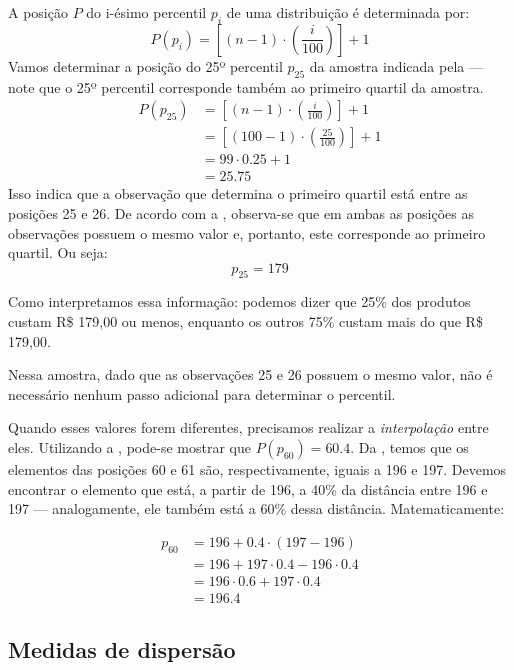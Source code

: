 A posição $P$ do i-ésimo percentil $p_i$ de uma distribuição é determinada por:
\begin{equation}
    P(p_i)=\left[(n-1) \cdot \left(\frac{i}{100}\right)\right] + 1
    \label{eq:pos-percentil}
\end{equation}
Vamos determinar a posição do 25º percentil $p_{25}$ da amostra indicada pela
 --- note que o 25º percentil corresponde
também ao primeiro quartil da amostra.
\begin{align*}
    P(p_{25})&=\left[(n-1) \cdot \left(\frac{i}{100}\right)\right] + 1 \\
             &=\left[(100-1) \cdot \left(\frac{25}{100}\right)\right] + 1 \\
             &=99 \cdot 0.25 + 1 \\
             &=25.75
\end{align*}
Isso indica que a observação que determina o primeiro quartil está entre as
posições 25 e 26. De acordo com a ,
observa-se que em ambas as posições as observações possuem o mesmo valor
e, portanto, este corresponde ao primeiro quartil. Ou seja:
\[
    p_{25}=179
\]

Como interpretamos essa informação: podemos dizer que 25\% dos produtos custam
R\$ 179,00 ou menos, enquanto os outros 75\% custam mais do que R\$ 179,00.

Nessa amostra, dado que as observações 25 e 26 possuem o mesmo valor, não é
necessário nenhum passo adicional para determinar o percentil.

Quando esses valores forem diferentes, precisamos realizar a
\emph{interpolação} entre eles. Utilizando a ,
pode-se mostrar que $P(p_{60})=60.4$. Da
, temos que os elementos das posições 60 e 61
são, respectivamente, iguais a 196 e 197. Devemos encontrar o elemento que
está, a partir de 196, a 40\% da distância entre 196 e 197 --- analogamente,
ele também está a 60\% dessa distância. Matematicamente:

\begin{align*}
    p_{60} &= 196 + 0.4 \cdot (197-196) \\
           &= 196 + 197 \cdot 0.4 - 196 \cdot 0.4 \\
           &= 196 \cdot 0.6 + 197 \cdot 0.4 \\
           &= 196.4
\end{align*}

\subsection{Medidas de dispersão}%
\label{subsub:medidas-dispersao}


